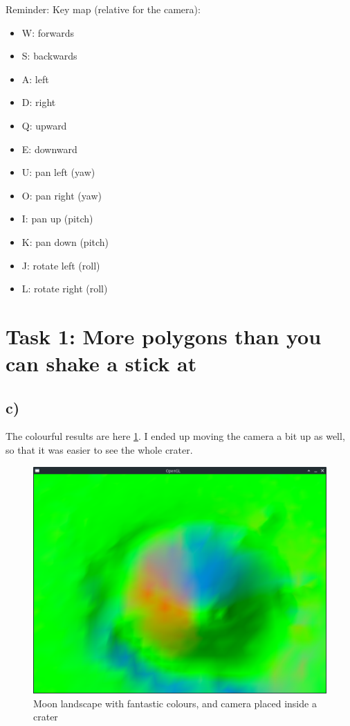 Reminder: Key map (relative for the camera): 
\begin{itemize}
    \item W: forwards
    \item S: backwards 
    \item A: left
    \item D: right
    \item Q: upward
    \item E: downward
    \item U: pan left (yaw)
    \item O: pan right (yaw)
    \item I: pan up (pitch)
    \item K: pan down (pitch)
    \item J: rotate left (roll)
    \item L: rotate right (roll)
\end{itemize}

\section{Task 1: More polygons than you can shake a stick at}
\subsection{c)}
The colourful results are here \cref{fig:task1c}. I ended up moving the camera a bit up as well, so that it was easier to see the whole crater. 

\begin{figure}[tp]
	\centering
	\includegraphics[width=1.00\textwidth]{figures/task1c}
	\caption{Moon landscape with fantastic colours, and camera placed inside a crater}
\label{fig:task1c}
\end{figure}

